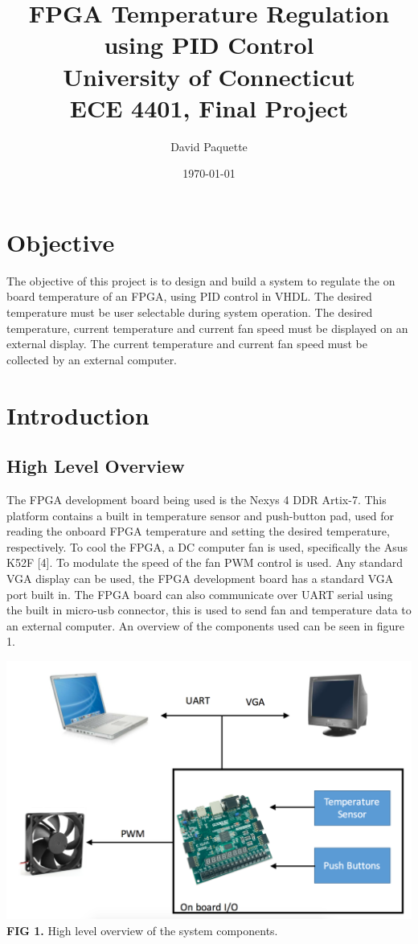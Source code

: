 \documentclass{article}
\title{\textbf{FPGA Temperature Regulation using PID Control \\  University of Connecticut \\ ECE 4401, Final Project}}
\author{David Paquette}
\date{\today}
\begin{document}
\maketitle

\tableofcontents{}
\newpage
\section{Objective}
The objective of this project is to design and build a system to regulate the on board temperature of an FPGA, using PID control in VHDL. The desired temperature must be user selectable during system operation. The desired temperature, current temperature and current fan speed must be displayed on an external display. The current temperature and current fan speed must be collected by an external computer.

\section{Introduction}
\subsection{High Level Overview}
The FPGA development board being used is the Nexys 4 DDR Artix-7. This platform contains a built in temperature sensor and push-button pad, used for reading the onboard FPGA temperature and setting the desired temperature, respectively. To cool the FPGA, a DC computer fan is used, specifically the Asus K52F [4]. To modulate the speed of the fan PWM control is used. Any standard VGA display can be used, the FPGA development board has a standard VGA port built in. The FPGA board can also communicate over UART serial using the built in micro-usb connector, this is used to send fan and temperature data to an external computer. An overview of the components used can be seen in figure 1.
\begin{center}
\includegraphics[scale=.4]{images/Overview}\\
\textbf{FIG 1.} High level overview of the system components.\\
\end{center}
\end{document}
